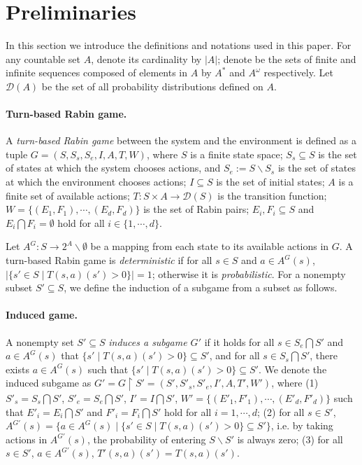 \documentclass[runningheads,a4paper]{llncs}
\begin{document}
\section{Preliminaries}
In this section we introduce the definitions and notations used in this paper. For any countable set $A$, denote its cardinality by $|A|$; denote be the sets of finite and infinite sequences composed of elements in $A$ by $A^{*}$ and $A^{\omega}$ respectively. Let $\mathcal{D}(A)$ be the set of all probability distributions defined on $A$. 

\paragraph{Turn-based Rabin game.}
A \emph{turn-based Rabin game} between the system and the environment is defined as a tuple $G = (S, S_s, S_e, I, A, T, W)$, where $S$ is a finite state space; $S_s \subseteq S$ is the set of states at which the system chooses actions, and $S_e := S \backslash S_s$ is the set of states at which the environment chooses actions; $I \subseteq S$ is the set of initial states; $A$ is a finite set of available actions; $T: S \times A \rightarrow \mathcal{D}(S)$ is the transition function; $W = \{ (E_1, F_1), \cdots, (E_d, F_d) \}$ is the set of Rabin pairs; $E_i, F_i \subseteq S$ and $E_i \bigcap F_i = \emptyset$ hold for all $i \in \{1, \cdots, d\}$.

Let $A^G: S \rightarrow 2^A \backslash \emptyset$ be a mapping from each state to its available actions in $G$. A turn-based Rabin game is \emph{deterministic} if for all $s \in S$ and $a \in A^G(s)$, $|\{s' \in S \mid T(s,a)(s') > 0\}| = 1$; otherwise it is \emph{probabilistic}. For a nonempty subset $S' \subseteq S$, we define the induction of a subgame from a subset as follows. 


\paragraph{Induced game.}
A nonempty set $S' \subseteq S$ \emph{induces a subgame $G'$} if it holds for all $s \in  S_e \bigcap S'$ and $a \in A^G(s)$ that $\{s' \mid T(s,a)(s') > 0\} \subseteq S'$, and for all $s \in S_s \bigcap S'$, there exists $a \in A^G(s)$ such that $\{s' \mid T(s,a)(s') > 0\} \subseteq S'$. We denote the induced subgame as $G' = G \upharpoonright S' = (S', S'_s, S'_e, I', A, T', W')$, where (1) $S'_s = S_s \bigcap S'$, $S'_e = S_e \bigcap S'$, $I' = I \bigcap S'$, $W' = \{ (E'_1, F'_1), \cdots, (E'_d, F'_d)\}$ such that $E'_i = E_i \bigcap S'$ and $F'_i = F_i \bigcap S'$ hold for all $i = 1, \cdots, d$; (2) for all $s \in S'$, $A^{G'}(s) = \{a \in A^G(s) \mid \{s' \in S \mid T(s,a)(s') > 0\} \subseteq S'\}$, i.e. by taking actions in $A^{G'}(s)$, the probability of entering $S \backslash S'$ is always zero; (3) for all $s \in S'$, $a \in A^{G'}(s)$, $T'(s,a)(s') = T(s,a)(s')$. 
\end{document}
